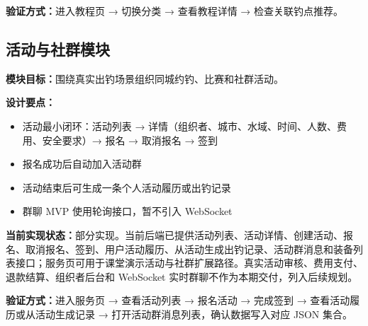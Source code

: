 \textbf{验证方式：}进入教程页 → 切换分类 → 查看教程详情 → 检查关联钓点推荐。

\subsection{活动与社群模块}

\textbf{模块目标：}围绕真实出钓场景组织同城约钓、比赛和社群活动。

\textbf{设计要点：}
\begin{itemize}
  \item 活动最小闭环：活动列表 → 详情（组织者、城市、水域、时间、人数、费用、安全要求）→ 报名 → 取消报名 → 签到
  \item 报名成功后自动加入活动群
  \item 活动结束后可生成一条个人活动履历或出钓记录
  \item 群聊 MVP 使用轮询接口，暂不引入 WebSocket
\end{itemize}

\textbf{当前实现状态：}部分实现。当前后端已提供活动列表、活动详情、创建活动、报名、取消报名、签到、用户活动履历、从活动生成出钓记录、活动群消息和装备列表接口；服务页可用于课堂演示活动与社群扩展路径。真实活动审核、费用支付、退款结算、组织者后台和 WebSocket 实时群聊不作为本期交付，列入后续规划。

\textbf{验证方式：}进入服务页 → 查看活动列表 → 报名活动 → 完成签到 → 查看活动履历或从活动生成记录 → 打开活动群消息列表，确认数据写入对应 JSON 集合。
